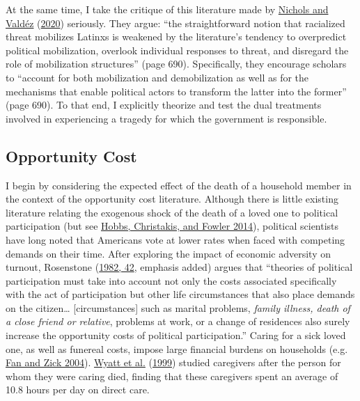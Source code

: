 \documentclass[
  12pt,
]{article}
\begin{document}
At the same time, I take the critique of this literature made by \protect\hyperlink{ref-Nichols2020a}{Nichols and Valdéz} (\protect\hyperlink{ref-Nichols2020a}{2020}) seriously. They argue: ``the straightforward notion that racialized threat mobilizes Latinxs is weakened by the literature's tendency to overpredict political mobilization, overlook individual responses to threat, and disregard the role of mobilization structures'' (page 690). Specifically, they encourage scholars to ``account for both mobilization and demobilization as well as for the mechanisms that enable political actors to transform the latter into the former'' (page 690). To that end, I explicitly theorize and test the dual treatments involved in experiencing a tragedy for which the government is responsible.

\hypertarget{opportunity-cost}{%
\subsection*{Opportunity Cost}\label{opportunity-cost}}

I begin by considering the expected effect of the death of a household member in the context of the opportunity cost literature. Although there is little existing literature relating the exogenous shock of the death of a loved one to political participation (but see \protect\hyperlink{ref-Hobbs2014}{Hobbs, Christakis, and Fowler 2014}), political scientists have long noted that Americans vote at lower rates when faced with competing demands on their time. After exploring the impact of economic adversity on turnout, Rosenstone (\protect\hyperlink{ref-Rosenstone1982}{1982, 42}, emphasis added) argues that ``theories of political participation must take into account not only the costs associated specifically with the act of participation but other life circumstances that also place demands on the citizen\ldots{} {[}circumstances{]} such as marital problems, \emph{family illness, death of a close friend or relative}, problems at work, or a change of residences also surely increase the opportunity costs of political participation.'' Caring for a sick loved one, as well as funereal costs, impose large financial burdens on households (e.g. \protect\hyperlink{ref-Fan2004}{Fan and Zick 2004}). \protect\hyperlink{ref-Wyatt1999}{Wyatt et al.} (\protect\hyperlink{ref-Wyatt1999}{1999}) studied caregivers after the person for whom they were caring died, finding that these caregivers spent an average of 10.8 hours per day on direct care.
\end{document}
